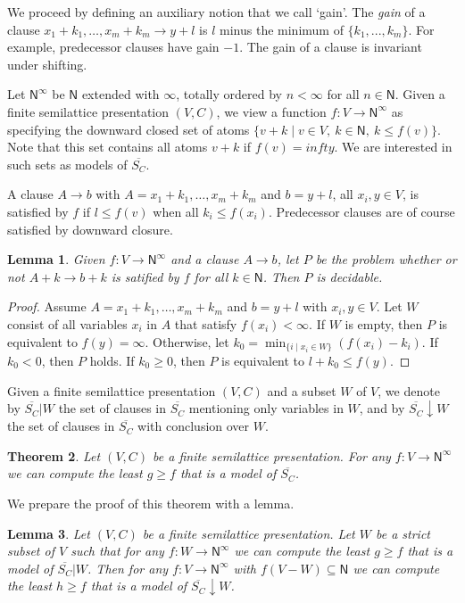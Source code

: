 \documentclass[11pt,a4paper]{article}
\newtheorem{theorem}{Theorem}[section]
\newtheorem{lemma}[theorem]{Lemma}
\newcommand{\N}{\mathsf{N}}
\newcommand\set[1]{\{#1\}}
\newcommand\jbody[3]{{{#1_1}+{#2_1}},\ldots,{{#1_#3}+{#2_#3}}}
\newcommand\Ninf{\N^\infty}
\newcommand\upS[1]{\overline{S_{#1}}}
\newcommand{\FYI}[1]{{\color{red}#1}}
\begin{document}
We proceed by defining an auxiliary notion that we call `gain'.
The \emph{gain} of a clause $\jbody{x}{k}{m}\to y+l$ is $l$ 
minus the minimum of $\set{k_1, ... ,k_m}$.
For example, predecessor clauses have gain $-1$.
The gain of a clause is invariant under shifting.

Let $\Ninf$ be $\N$ extended with $\infty$, totally ordered
by $n < \infty$ for all $n\in\N$. 
Given a finite semilattice presentation $(V,C)$, we view
a function $f: V\to\Ninf$ as specifying the downward closed set
of atoms $\set{v+k \mid v\in V,~k\in\N,~k \leqslant f(v)}$.
\FYI{Note that this set contains all atoms $v+k$ if $f(v)=infty$.}
We are interested in such sets as models of $\upS{C}$.
\FYI{A clause $A\to b$ with 
$A = \jbody{x}{k}{m}$ and $b= y+l$, all $x_i,y \in V$,
is satisfied by $f$ if $l\leqslant f(v)$ when all $k_i \leqslant f(x_i)$.
Predecessor clauses are of course satisfied by downward closure.

\begin{lemma}\label{lem:f-sat}
Given $f: V\to\Ninf$ and a clause $A\to b$, let $P$ be the problem whether or not
$A+k\to b+k$ is satified by $f$ for all $k\in\N$. Then $P$ is decidable.
\end{lemma}
\begin{proof}
Assume $A = \jbody{x}{k}{m}$ and $b= y+l$ with $x_i,y \in V$.
Let $W$ consist of all variables $x_i$ in $A$ that satisfy $f(x_i)<\infty$.
If $W$ is empty, then $P$ is equivalent to $f(y)=\infty$.
Otherwise, let $k_0 = \min_{\set{i \mid x_i \in W}} (f(x_i)-k_i)$.
If $k_0 < 0$, then $P$ holds. If $k_0 \geqslant 0$, 
then $P$ is equivalent to $l+k_0 \leqslant f(y)$.
\end{proof}}

Given a finite semilattice presentation $(V,C)$
and a subset $W$ of $V$, we denote by $\upS{C}|W$ 
the set of clauses in $\upS{C}$ mentioning only variables in $W$,
and by $\upS{C}{\downarrow}W$
the set of clauses in $\upS{C}$ with conclusion over $W$.

\begin{theorem}\label{thm:main}
Let  $(V,C)$ be a finite semilattice presentation.
For any $f: V\to\Ninf$ we can compute
the least $g \geqslant f$ that is a model of $\upS{C}$.
\end{theorem}

We prepare the proof of this theorem with a lemma.

\begin{lemma}\label{lem:secondary}
Let  $(V,C)$ be a finite semilattice presentation.
Let $W$ be a strict subset of $V$ such that 
for any $f: W\to\Ninf$ we can compute
the least $g \geqslant f$ that is a model of $\upS{C}|W$.
Then for any $f: V\to\Ninf$ with $f(V-W)\subseteq \N$ we can compute
the least $h \geqslant f$ that is a model of $\upS{C}{\downarrow}W$.
\end{lemma}
\end{document}
